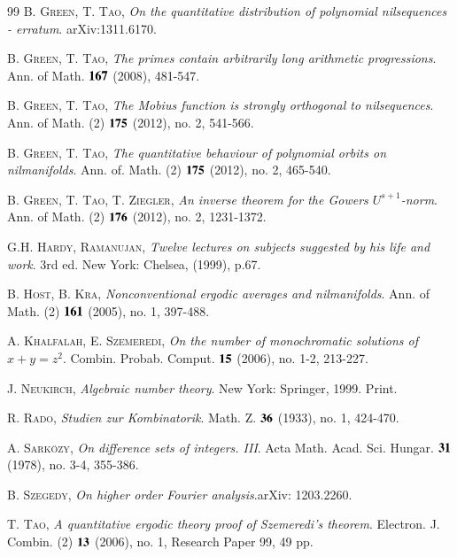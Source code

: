\documentclass[12pt,amstex]{amsart}
\theoremstyle{definition}
\begin{document}
\begin{thebibliography}{99}
\textsc{B. Green, T. Tao}, \emph{On the quantitative distribution of polynomial nilsequences - erratum}. arXiv:1311.6170.

\textsc{B. Green, T. Tao}, \emph{The primes contain arbitrarily long arithmetic progressions}. Ann. of Math. $\bold{167}$ (2008),
    481-547.

\textsc{B. Green, T. Tao}, \emph{The Mobius function is strongly orthogonal to nilsequences}. Ann. of Math. (2) $\bold{175}$ (2012), no. 2,
    541-566.

\textsc{B. Green, T. Tao}, \emph{The quantitative behaviour of polynomial orbits on nilmanifolds}. Ann. of. Math. (2) $\bold{175}$ (2012), no. 2, 465-540.

\textsc{B. Green, T. Tao, T. Ziegler}, \emph{An inverse theorem for the Gowers $U^{s+1}$-norm}. Ann. of Math. (2) $\bold{176}$ (2012), no. 2,
    1231-1372.

\textsc{G.H. Hardy, Ramanujan}, \emph{Twelve lectures on subjects suggested by his life and work}. 3rd ed. New York: Chelsea, (1999), p.67.

\textsc{B. Host, B. Kra}, \emph{Nonconventional ergodic averages and nilmanifolds}. Ann. of Math. (2) $\bold{161}$ (2005), no. 1, 397-488.

\textsc{A. Khalfalah, E. Szemeredi}, \emph{On the number of monochromatic solutions of $x+y=z^{2}$}. Combin.
Probab. Comput. $\bold{15}$ (2006), no. 1-2, 213-227.

\textsc{J. Neukirch}, \emph{Algebraic number theory}. New York: Springer, 1999. Print.

\textsc{R. Rado}, \emph{Studien zur Kombinatorik}. Math. Z. $\bold{36}$ (1933), no. 1, 424-470.

\textsc{A. Sark\"{o}zy}, \emph{On difference sets of integers. III}. Acta Math. Acad. Sci. Hungar. $\bold{31}$ (1978), no. 3-4, 355-386.

\textsc{B. Szegedy}, \emph{On higher order Fourier analysis}.arXiv: 1203.2260.

\textsc{T. Tao}, \emph{A quantitative ergodic theory proof of Szemeredi's theorem}. Electron. J. Combin. (2) $\bold{13}$ (2006), no. 1, Research Paper 99, 49 pp.

\end{thebibliography}
\end{document}
